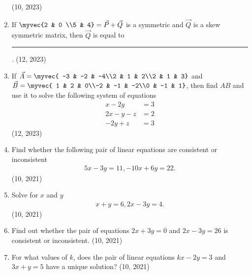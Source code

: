 \begin{enumerate}[label=\thesubsection.\arabic*,ref=\thesubsection.\theenumi]
\hfill (10, 2023)
    \item If $\myvec{2 & 0 \\5 & 4} = \vec{P} + \vec{Q}$ 
	    is a symmetric and $\vec{Q}$ is a skew symmetric matrix, then $\vec{Q}$ is equal to \rule{1cm}{0.2pt}.
\hfill (12, 2023)
    \item If $\vec{A}=\myvec{ -3 & -2 & -4\\2 & 1 & 2\\2 & 1 & 3}$
and $\vec{B} =\myvec{  1 & 2 & 0\\-2 & -1 & -2\\0 & -1 & 1}$, then find $AB$ and use it to solve the following system of equations 
\begin{align*} x - 2y &= 3\\2x - y - z &= 2\\-2y + z &= 3\end{align*}
\hfill (12, 2023)
    \item Find whether the following pair of linear equations are consistent or inconsistent
    \begin{align*}
     5x - 3y = 11, -10x + 6y = 22.
    \end{align*}
\hfill (10, 2021)
    \item Solve for $x$ and $y$
    \begin{align*}
    x + y = 6, 2x - 3y = 4.
    \end{align*}
\hfill (10, 2021)
    \item Find out whether the pair of equations $2x + 3y = 0$ and $2x - 3y = 26$ is consistent or inconsistent.
\hfill (10, 2021)
    
    \item For what values of $k$, does the pair of linear equations $kx - 2y = 3$ and $3x + y = 5$ have a unique solution?
\hfill (10, 2021)
    

\end{enumerate}
